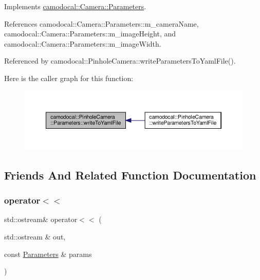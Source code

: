 Implements \hyperlink{classcamodocal_1_1Camera_1_1Parameters_a7da3e505d5b047c7bfa3cf94d6c97710}{camodocal\+::\+Camera\+::\+Parameters}.



References camodocal\+::\+Camera\+::\+Parameters\+::m\+\_\+camera\+Name, camodocal\+::\+Camera\+::\+Parameters\+::m\+\_\+image\+Height, and camodocal\+::\+Camera\+::\+Parameters\+::m\+\_\+image\+Width.



Referenced by camodocal\+::\+Pinhole\+Camera\+::write\+Parameters\+To\+Yaml\+File().

Here is the caller graph for this function\+:\nopagebreak
\begin{figure}[H]
\begin{center}
\leavevmode
\includegraphics[width=350pt]{classcamodocal_1_1PinholeCamera_1_1Parameters_ace74203c61ef30b57a2ba21184070bb5_icgraph}
\end{center}
\end{figure}


\subsection{Friends And Related Function Documentation}
\mbox{\label{classcamodocal_1_1PinholeCamera_1_1Parameters_a392b64d625819770f4efedc75838cc42}} 
\subsubsection{\texorpdfstring{operator$<$$<$}{operator<<}}
{\footnotesize\ttfamily std\+::ostream\& operator$<$$<$ (\begin{DoxyParamCaption}\item[{std\+::ostream \&}]{out,  }\item[{const \hyperlink{classcamodocal_1_1PinholeCamera_1_1Parameters}{Parameters} \&}]{params }\end{DoxyParamCaption})\hspace{0.3cm}{\ttfamily [friend]}}



